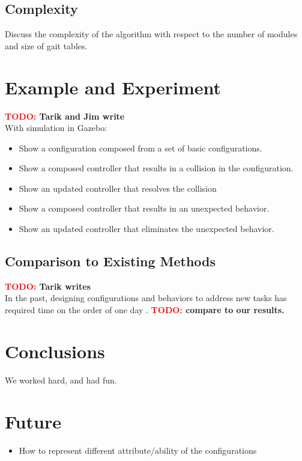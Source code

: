 \documentclass[conference]{IEEEtran}
\theoremstyle{definition}
\newcommand{\TODO}[1]{ {\bf \textcolor{red}{TODO:} #1 }}
\begin{document}
\subsection{Complexity}
Discuss the complexity of the algorithm with respect to the number of modules and size of gait tables.

\section{Example and Experiment}
\label{sec:example}
\TODO{Tarik and Jim write}\\
With simulation in Gazebo:
\begin{itemize}
\item Show a configuration composed from a set of basic configurations.
\item Show a composed controller that results in a collision in the configuration.
\item Show an updated controller that resolves the collision
\item Show a composed controller that results in an unexpected behavior.
\item Show an updated controller that eliminates the unexpected behavior.
\end{itemize}
\subsection{Comparison to Existing Methods}
\TODO{Tarik writes}\\
In the past, designing configurations and behaviors to address new tasks has required
time on the order of one day \cite{sastra2011using}. \TODO{compare to our results.}

\section{Conclusions}
We worked hard, and had fun.

\section{Future}
\begin{itemize}
\item How to represent different attribute/ability of the configurations
\end{itemize}







\end{document}
